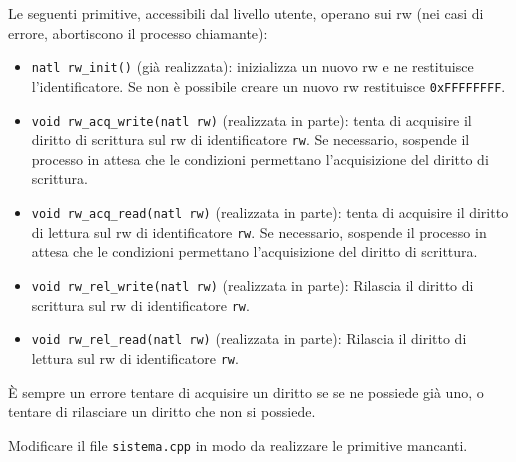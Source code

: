 Le seguenti primitive, accessibili dal livello utente, operano sui
rw (nei casi di errore, abortiscono il processo chiamante):
\begin{itemize}
\item \verb|natl rw_init()| (gi\`a
realizzata): inizializza un nuovo rw e ne restituisce l'identificatore.
Se non \`e possibile creare un nuovo rw restituisce {\tt 0xFFFFFFFF}.
\item \verb|void rw_acq_write(natl rw)|
(realizzata in parte): tenta di acquisire il diritto di scrittura sul rw di identificatore
{\tt rw}.
Se necessario, sospende il processo in attesa che le condizioni permettano 
l'acquisizione del diritto di scrittura.
\item \verb|void rw_acq_read(natl rw)| (realizzata in parte):
tenta di acquisire il diritto di lettura sul rw di identificatore {\tt rw}.
Se necessario, sospende il processo in attesa che le condizioni permettano 
l'acquisizione del diritto di scrittura.
\item \verb|void rw_rel_write(natl rw)| (realizzata in parte): 
Rilascia il diritto di scrittura sul rw di identificatore {\tt rw}.
\item \verb|void rw_rel_read(natl rw)| (realizzata in parte):
Rilascia il diritto di lettura sul rw di identificatore {\tt rw}.
\end{itemize}
\`E sempre un errore tentare di acquisire un diritto se se ne possiede gi\`a uno, o tentare
di rilasciare un diritto che non si possiede.

Modificare il file \verb|sistema.cpp| in modo da realizzare le primitive mancanti.

